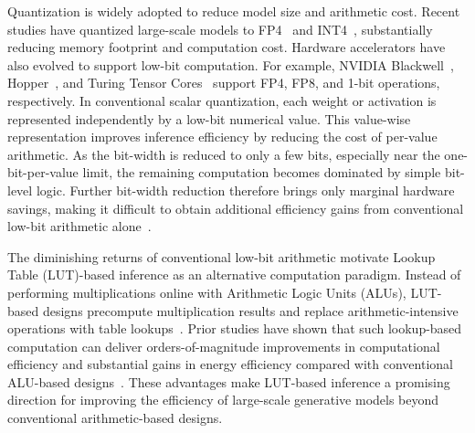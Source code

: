 Quantization is widely adopted to reduce model size and arithmetic cost. Recent studies have quantized large-scale models to FP4~\cite{svdquant} and INT4~\cite{convrot,svdquant,ViDiT-Q}, substantially reducing memory footprint and computation cost. Hardware accelerators have also evolved to support low-bit computation. For example, NVIDIA Blackwell~\cite{b200}, Hopper~\cite{h100}, and Turing Tensor Cores~\cite{turing} support FP4, FP8, and 1-bit operations, respectively. In conventional scalar quantization, each weight or activation is represented independently by a low-bit numerical value. This value-wise representation improves inference efficiency by reducing the cost of per-value arithmetic. As the bit-width is reduced to only a few bits, especially near the one-bit-per-value limit, the remaining computation becomes dominated by simple bit-level logic. Further bit-width reduction therefore brings only marginal hardware savings, making it difficult to obtain additional efficiency gains from conventional low-bit arithmetic alone~\cite{lut-dla,accelerator-wall,Irreversibility,cmos-limits}.

The diminishing returns of conventional low-bit arithmetic motivate Lookup Table (LUT)-based inference as an alternative computation paradigm. Instead of performing multiplications online with Arithmetic Logic Units (ALUs), LUT-based designs precompute multiplication results and replace arithmetic-intensive operations with table lookups~\cite{pqa,maddness,pim-dl,pecan,lut-nn}. Prior studies have shown that such lookup-based computation can deliver orders-of-magnitude improvements in computational efficiency and substantial gains in energy efficiency compared with conventional ALU-based designs~\cite{lut-dla,accelerator-wall}. These advantages make LUT-based inference a promising direction for improving the efficiency of large-scale generative models beyond conventional arithmetic-based designs.

